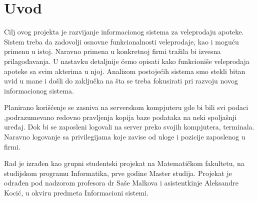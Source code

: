 \section{Uvod}

Cilj ovog projekta je razvijanje informacionog sistema za veleprodaju apoteke. Sistem treba da zadovolji osnovne funkcionalnosti veleprodaje, kao i moguću primenu u istoj. Naravno primena u konkretnoj firmi tražila bi izvesna prilagođavanja. U nastavku detaljnije ćemo opisati kako funkcioniše veleprodaja apoteke sa svim akterima u njoj. Analizom postojećih sistema smo stekli bitan uvid u mane i došli do zaključka na šta se treba fokusirati pri razvoju novog informacionog sistema.

Planirano korišćenje se zasniva na serverskom kompjuteru gde bi bili svi podaci ,podrazumevano redovno pravljenja kopija baze podataka na neki spoljašnji uređaj. Dok bi se zaposleni logovali na server preko svojih kompjutera, terminala. Naravno logovanje sa privilegijama koje zavise od uloge i pozicije zaposlenog u firmi.

Rad je izrađen kao grupni studentski projekat na Matematičkom fakultetu, na studijskom programu Informatika, prve godine Master studija. Projekat je odrađen pod nadzorom profesora dr Saše Malkova i asistentkinje Aleksandre Kocić, u okviru predmeta Informacioni sistemi.

\clearpage